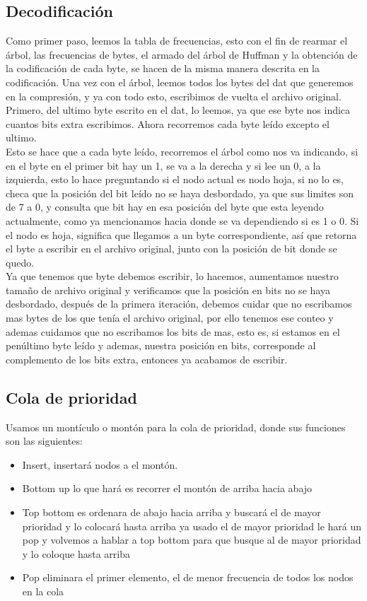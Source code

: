 \documentclass[12 pt]{report}
\begin{document}
\subsection*{Decodificación}

Como primer paso, leemos la tabla de frecuencias, esto con el fin de rearmar el árbol, las frecuencias de bytes, el armado del árbol de Huffman y la obtención de la codificación de cada byte, se hacen de la misma manera descrita en la codificación. Una vez con el árbol, leemos todos los bytes del dat que generemos en la compresión, y ya con todo esto, escribimos de vuelta el archivo original. Primero, del ultimo byte escrito en el dat, lo leemos, ya que ese byte nos indica cuantos bits extra escribimos. Ahora recorremos cada byte leído excepto el ultimo.\\
Esto se hace que a cada byte leído, recorremos el árbol como nos va indicando, si en el byte en el primer bit hay un 1, se va a la derecha y si lee un 0, a la izquierda, esto lo hace preguntando si el nodo actual es nodo hoja, si no lo es, checa que la posición del bit leído no se haya desbordado, ya que sus limites son de 7 a 0, y consulta que bit hay en esa posición del byte que esta leyendo actualmente, como ya mencionamos hacia donde se va dependiendo si es 1 o 0. Si el nodo es hoja, significa que llegamos a un byte correspondiente, así que retorna el byte a escribir en el archivo original, junto con la posición de bit donde se quedo. \\
Ya que tenemos que byte debemos escribir, lo hacemos, aumentamos nuestro tamaño de archivo original y verificamos que la posición en bits no se haya desbordado, después de la primera iteración, debemos cuidar que no escribamos mas bytes de los que tenía el archivo original, por ello tenemos ese conteo y ademas cuidamos que no escribamos los bits de mas, esto es, si estamos en el penúltimo byte leído y ademas, nuestra posición en bits, corresponde al complemento de los bits extra, entonces ya acabamos de escribir.

\subsection*{Cola de prioridad}
Usamos un montículo o montón para la cola de prioridad, donde sus funciones son las siguientes:\\
\begin{itemize}
\item Insert, insertará nodos a el montón.
\item Bottom up lo que hará es recorrer el montón de arriba hacia abajo
\item Top bottom es ordenara de abajo hacia arriba y buscará el de mayor prioridad y lo colocará hasta arriba ya usado el de mayor prioridad le hará un pop y volvemos a hablar a top bottom para que busque al de mayor prioridad y lo coloque hasta arriba
\item Pop eliminara el primer elemento, el de menor frecuencia de todos los nodos en la cola
\end{itemize}
\newpage
\end{document}
